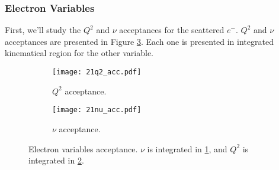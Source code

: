\subsubsection{Electron Variables}
\label{14.21::electron_variables}
    First, we'll study the $Q^2$ and $\nu$ acceptances for the scattered $e^-$.
    $Q^2$ and $\nu$ acceptances are presented in Figure \ref{fig::14.21::electron_acc}.
    Each one is presented in integrated kinematical region for the other variable.

    \begin{figure}
        \centering
        \begin{subfigure}[b]{0.49\textwidth}
            \centering
            \texttt{[image: 21q2\_acc.pdf]}
            \caption{$Q^2$ acceptance.}
            \label{fig::14.21::q2_acc}
        \end{subfigure}
        \hfill
        \begin{subfigure}[b]{0.49\textwidth}
            \centering
            \texttt{[image: 21nu\_acc.pdf]}
            \caption{$\nu$ acceptance.}
            \label{fig::14.21::nu_acc}
        \end{subfigure}
        \caption[Electron variables acceptance.]{Electron variables acceptance. $\nu$ is integrated in \ref{fig::14.21::q2_acc}, and $Q^2$ is integrated in \ref{fig::14.21::nu_acc}.}
        \label{fig::14.21::electron_acc}
    \end{figure}
